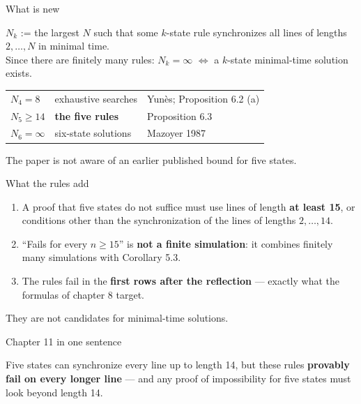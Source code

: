 \begin{frame}{What is new}
\begin{plainbox}
$N_k$ := the largest $N$ such that some $k$-state rule synchronizes all lines of lengths $2,\dots,N$ in minimal time.\\ Since there are finitely many rules: $N_k=\infty$ $\Longleftrightarrow$ a $k$-state minimal-time solution exists.
\end{plainbox}
\vspace{1ex}
\renewcommand{\arraystretch}{1.3}
\begin{center}
\begin{tabular}{@{}lll@{}}
$N_4=8$ & exhaustive searches & Yun\`es; Proposition 6.2 (a)\\
$N_5\ge14$ & \textbf{the five rules} & Proposition 6.3\\
$N_6=\infty$ & six-state solutions & Mazoyer 1987
\end{tabular}
\end{center}
\small The paper is not aware of an earlier published bound for five states.
\end{frame}

\begin{frame}{What the rules add}
\begin{enumerate}
\item A proof that five states do not suffice must use lines of length \textbf{at least 15}, or conditions other than the synchronization of the lines of lengths $2,\dots,14$.
\item ``Fails for every $n\ge15$'' is \textbf{not a finite simulation}: it combines finitely many simulations with Corollary 5.3.
\item The rules fail in the \textbf{first rows after the reflection} --- exactly what the formulas of chapter 8 target.
\end{enumerate}
\vspace{1ex}
\begin{center}\color{mute} They are not candidates for minimal-time solutions.\end{center}
\end{frame}

\begin{frame}{Chapter 11 in one sentence}
\vspace{4ex}
\begin{plainbox}\large
Five states can synchronize every line up to length 14, but these rules \textbf{provably fail on every longer line} --- and any proof of impossibility for five states must look beyond length 14.
\end{plainbox}
\end{frame}

